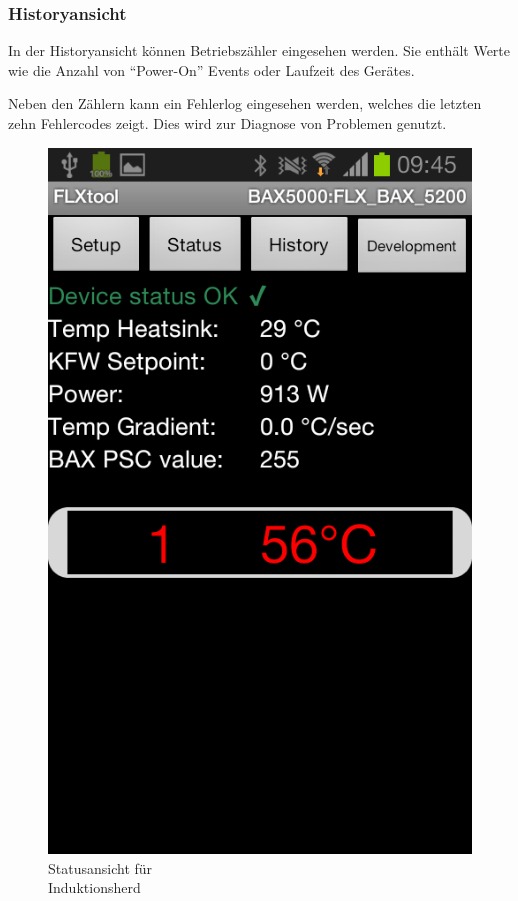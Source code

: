 \subsubsection{Historyansicht}
\label{subsubsec:Ansichten}
In der Historyansicht können Betriebszähler eingesehen werden. Sie enthält Werte wie die Anzahl von \enquote{Power-On} Events oder Laufzeit des Gerätes.

Neben den Zählern kann ein Fehlerlog eingesehen werden, welches die letzten zehn Fehlercodes zeigt. Dies wird zur Diagnose von Problemen genutzt.

\begin{figure}
	\vspace{-0.5cm}
	\includegraphics[scale=0.3]{analysis/res/ShowStatusInduction}
	\caption{Statusansicht für \\Induktionsherd}
\end{figure}


